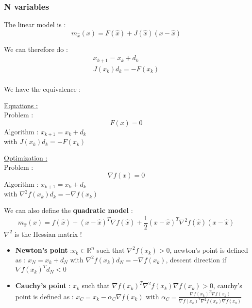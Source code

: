 \documentclass[../main.tex]{subfiles}
\begin{document}
\subsubsection{N variables}

The linear model is : \begin{equation}
    m_{\hat{x}} (x) = F(\hat{x}) + J(\hat{x})(x-\hat{x})
\end{equation}

We can therefore do : \begin{equation}\begin{gathered}
    x_{k+1} = x_k + d_k\\
    J(x_k)d_k = -F(x_k)\\
    \end{gathered}
\end{equation}

We have the equivalence : \\
\begin{minipage}{.49\textwidth}
\underline{Equations :}\\
    Problem : \\
    \begin{equation}
        F(x) = 0
    \end{equation}
    Algorithm : $x_{k+1} = x_k + d_k$\\
    with $J(x_k) d_k = -F(x_k)$\\
\end{minipage}
\vline
\begin{minipage}{.5\textwidth}
\underline{Optimization :}\\
    Problem : \begin{equation}
        \nabla f(x) = 0
    \end{equation}
    Algorithm : $x_{k+1} = x_k + d_k$\\
    with $\nabla^2 f(x_k) d_k = -\nabla f(x_k)$\\
\end{minipage}

We can also define the \textbf{quadratic model} :\\
\begin{equation}
    m_{\hat{x}}(x) = f(\hat{x}) + (x-\hat{x})^T \nabla f(\hat{x}) + \frac{1}{2} (x-\hat{x})^T \nabla^2 f(\hat{x})(x-\hat{x})
\end{equation}
\warning $\nabla^2$ is the Hessian matrix !\\

\begin{itemize}
    \item \textbf{Newton's point} :$x_k \in \mathbb{R}^n$ such that $\nabla^2f(x_k)>0$, newton's point is defined as : $x_N = x_k + d_N$ with $\nabla^2 f(x_k) d_N = -\nabla f(x_k)$, descent direction if $\nabla f(x_k)^Td_N<0$\\
    \item \textbf{Cauchy's point} : $x_k$ such that $\nabla f(x_k)^T \nabla^2f(x_k) \nabla f(x_k) >0$, cauchy's point is defined as : $x_C = x_k - \alpha_C \nabla f(x_k)$ with $\alpha_C = \frac{\nabla f(x_k)^T \nabla f(x_k)}{\nabla f(x_k)^T \nabla^2 f(x_k) \nabla f(x_k)}$\\
\end{itemize}
\end{document}
